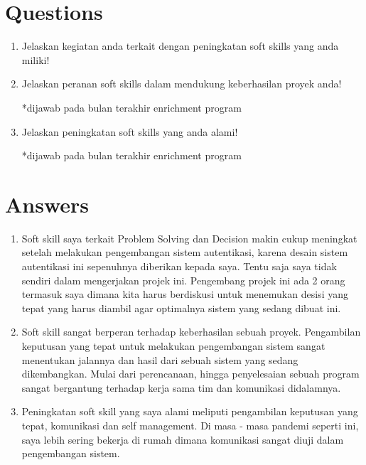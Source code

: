 \documentclass[12pt, letterpaper]{article}
\begin{document}
\section*{Questions}
\begin{enumerate}
    \item Jelaskan kegiatan anda terkait dengan peningkatan soft skills yang anda miliki!
    \item Jelaskan peranan soft skills dalam mendukung keberhasilan proyek anda!
    
    *dijawab pada bulan terakhir enrichment program
    \item Jelaskan peningkatan soft skills yang anda alami!
    
    *dijawab pada bulan terakhir enrichment program
\end{enumerate}

\section*{Answers}
\begin{enumerate}
    \item Soft skill saya terkait Problem Solving dan Decision makin cukup meningkat setelah melakukan pengembangan sistem autentikasi, karena desain sistem autentikasi ini sepenuhnya diberikan kepada saya. Tentu saja saya tidak sendiri dalam mengerjakan projek ini. Pengembang projek ini ada 2 orang termasuk saya dimana kita harus berdiskusi untuk menemukan desisi yang tepat yang harus diambil agar optimalnya sistem yang sedang dibuat ini.
    \item Soft skill sangat berperan terhadap keberhasilan sebuah proyek. Pengambilan keputusan yang tepat untuk melakukan pengembangan sistem sangat menentukan jalannya dan hasil dari sebuah sistem yang sedang dikembangkan. Mulai dari perencanaan, hingga penyelesaian sebuah program sangat bergantung terhadap kerja sama tim dan komunikasi didalamnya.
    \item Peningkatan soft skill yang saya alami meliputi pengambilan keputusan yang tepat, komunikasi dan self management. Di masa - masa pandemi seperti ini, saya lebih sering bekerja di rumah dimana komunikasi sangat diuji dalam pengembangan sistem.
\end{enumerate}
\end{document}
